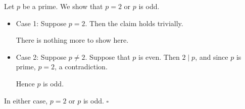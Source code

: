 Let $p$ be a prime.
We show that $p = 2$ or $p$ is odd.

\begin{itemize}
  \item Case 1: Suppose $p = 2$.
    Then the claim holds trivially.

    There is nothing more to show here.
  \item Case 2: Suppose $p \neq 2$.
    Suppose that $p$ is even.
    Then $2 \mid p$, and since $p$ is prime, $p = 2$, a contradiction.

    Hence $p$ is odd.
\end{itemize}

In either case, $p = 2$ or $p$ is odd. \hfill$\square$